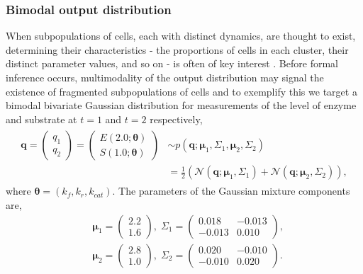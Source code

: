 \subsubsection{Bimodal output distribution}
When subpopulations of cells, each with distinct dynamics, are thought to exist, determining their characteristics - the proportions of cells in each cluster, their distinct parameter values, and so on - is often of key interest \cite{hasenauer2011identification,loos2018hierarchical}. Before formal inference occurs, multimodality of the output distribution may signal the existence of fragmented subpopulations of cells and to exemplify this we target a bimodal bivariate Gaussian distribution for measurements of the level of enzyme and substrate at $t=1$ and $t=2$ respectively,
%
\begin{equation}
\begin{gathered}\begin{aligned}
\boldsymbol{q} = \begin{pmatrix} q_1 \\ q_2 \end{pmatrix}
 = \begin{pmatrix} E(2.0; \boldsymbol{\theta}) \\ S(1.0; \boldsymbol{\theta}) \end{pmatrix}
&  \sim
p(\boldsymbol{q}; \boldsymbol{\mu}_1,\Sigma_1, \boldsymbol{\mu}_2, \Sigma_2) \\
&= \frac{1}{2}\left(\mathcal{N}(\boldsymbol{q}; \boldsymbol{\mu}_1,\Sigma_1)
+ \mathcal{N}(\boldsymbol{q}; \boldsymbol{\mu}_2,\Sigma_2)\right),
\end{aligned}\end{gathered}
\end{equation}
%
where $\boldsymbol{\theta}=(k_f,k_r,k_{cat})$. The parameters of the Gaussian mixture components are,
%
\begin{equation*}
\begin{aligned}
&\boldsymbol{\mu}_1=\begin{pmatrix} 2.2 \\ 1.6 \end{pmatrix} , \; \Sigma_1
                   =\begin{pmatrix} 0.018 & -0.013 \\ -0.013 & 0.010 \end{pmatrix}, \\
&\boldsymbol{\mu}_2=\begin{pmatrix} 2.8 \\ 1.0 \end{pmatrix}, \; \Sigma_2
                   =\begin{pmatrix} 0.020 & -0.010 \\ -0.010 & 0.020 \end{pmatrix}.
\end{aligned}
\end{equation*}
